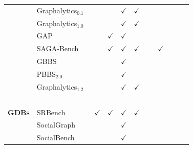 \begin{landscape}
\begin{table}[htbp]
{\begin{tabular}{ll|cccccccc}
                { ~              }  & { Graphalytics$_{0.1}$~\cite{Capota2015}  }      &               &              & $\checkmark$  & $\checkmark$  &               &               &               &               \\
                { ~              }  & { Graphalytics$_{1.0}$~\cite{Iosup2016}   }      &               &              & $\checkmark$  & $\checkmark$  &               &               &               &               \\
                { ~              }  & { GAP~\cite{Beamer2017}                   }      &               & $\checkmark$ & $\checkmark$  &               &               &               &               &               \\
                { ~              }  & { SAGA-Bench~\cite{Basak2020}             }      &               & $\checkmark$ & $\checkmark$  & $\checkmark$  &               & $\checkmark$  &               &               \\
                { ~              }  & { GBBS~\cite{Dhulipala2020,Dhulipala2021} }      &               &              & $\checkmark$  &               &               &               &               &               \\
                { ~              }  & { PBBS$_{2.0}$~\cite{Anderson2022}        }      &               &              & $\checkmark$  &               &               &               &               &               \\
                { ~              }  & { Graphalytics$_{1.2}$~\cite{Iosup2023}   }      &               &              & $\checkmark$  & $\checkmark$  &               &               &               &               \\
                { ~              }  & { ~                                       }      &               &       ~      &       ~       &       ~       &       ~       &       ~       &       ~       &      ~        \\
                { \textbf{\ac{GDB}s}  }  & { SRBench~\cite{Zhang2012}                }      & $\checkmark$  & $\checkmark$ & $\checkmark$  & $\checkmark$  &               &               &               &               \\
                { ~              }  & { SocialGraph~\cite{Angles2013}           }      &               &              & $\checkmark$  &               &               &               &               &               \\
                { ~              }  & { SocialBench~\cite{Erling2015}           }      &               &              & $\checkmark$  &               &               &               &               &               \\

\end{tabular}}
\end{table}
\end{landscape}

